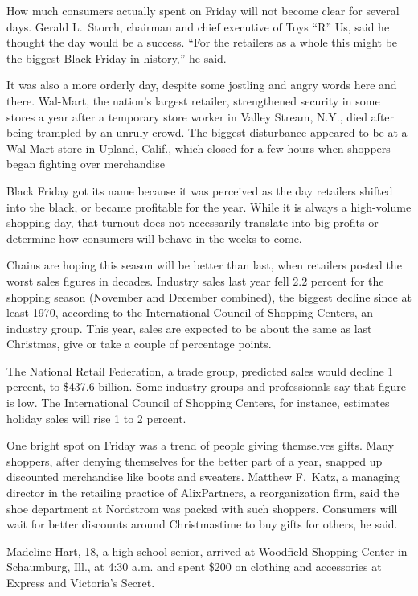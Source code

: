 ﻿\documentclass[12pt]{article}
\begin{document}
How much consumers actually spent on Friday will not become clear for several days. Gerald
L.~Storch, chairman and chief executive of Toys ``R'' Us, said he thought the day would be a
success. ``For the retailers as a whole this might be the biggest Black Friday in history,'' he
said.

It was also a more orderly day, despite some jostling and angry words here and there. Wal-Mart, the
nation's largest retailer, strengthened security in some stores a year after a temporary store
worker in Valley Stream, N.Y., died after being trampled by an unruly crowd. The biggest disturbance
appeared to be at a Wal-Mart store in Upland, Calif., which closed for a few hours when shoppers
began fighting over merchandise

Black Friday got its name because it was perceived as the day retailers shifted into the black, or
became profitable for the year. While it is always a high-volume shopping day, that turnout does not
necessarily translate into big profits or determine how consumers will behave in the weeks to come.

Chains are hoping this season will be better than last, when retailers posted the worst sales
figures in decades. Industry sales last year fell 2.2 percent for the shopping season (November and
December combined), the biggest decline since at least 1970, according to the International Council
of Shopping Centers, an industry group. This year, sales are expected to be about the same as last
Christmas, give or take a couple of percentage points.

The National Retail Federation, a trade group, predicted sales would decline 1 percent, to \$437.6
billion. Some industry groups and professionals say that figure is low. The International Council of
Shopping Centers, for instance, estimates holiday sales will rise 1 to 2 percent.

One bright spot on Friday was a trend of people giving themselves gifts. Many shoppers, after
denying themselves for the better part of a year, snapped up discounted merchandise like boots and
sweaters. Matthew F.~Katz, a managing director in the retailing practice of AlixPartners, a
reorganization firm, said the shoe department at Nordstrom was packed with such shoppers. Consumers
will wait for better discounts around Christmastime to buy gifts for others, he said.

Madeline Hart, 18, a high school senior, arrived at Woodfield Shopping Center in Schaumburg, Ill.,
at 4:30 a.m. and spent \$200 on clothing and accessories at Express and Victoria's Secret.
\end{document}
